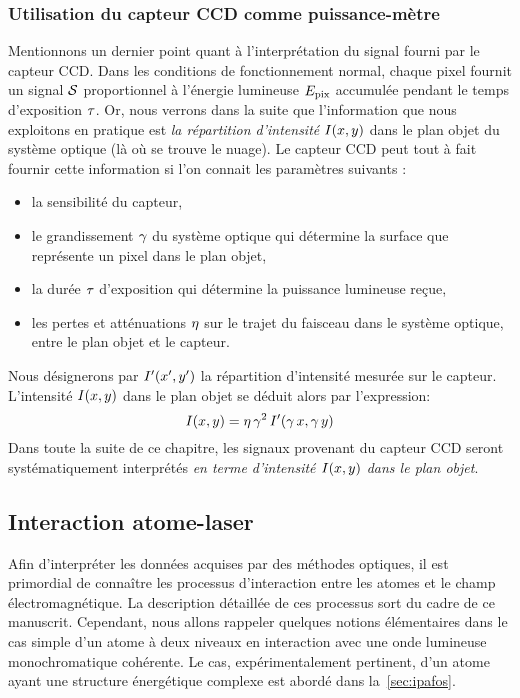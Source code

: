 \subsubsection{Utilisation du capteur CCD comme puissance-mètre}
Mentionnons un dernier point quant à l'interprétation du signal fourni par le capteur CCD. Dans les conditions de fonctionnement normal, chaque pixel fournit un signal ${\mathcal{S}}$ proportionnel à l'énergie lumineuse ${E_{\rm pix}}$ accumulée pendant le temps d'exposition ${\tau}$. Or, nous verrons dans la suite que l'information que nous exploitons en pratique est \emph{la répartition d'intensité} ${{I}(x,y)}$ dans le plan objet du système optique (là où se trouve le nuage). Le capteur CCD peut tout à fait fournir cette information si l'on connait les paramètres suivants :
\begin{itemize}
	\item la sensibilité du capteur,
	\item le grandissement ${\gamma}$ %
	du système optique qui détermine la surface que représente un pixel dans le plan objet,
	\item la durée ${\tau}$ %
	d'exposition qui détermine la puissance lumineuse reçue,
	\item les pertes et atténuations ${\eta}$ sur le trajet du faisceau dans le système optique, entre le plan objet et le capteur.
\end{itemize}
Nous désignerons par $I'(x',y')$ la répartition d'intensité mesurée sur le capteur. L'intensité ${{I}(x,y)}$ dans le plan objet se déduit alors par l'expression:%
%
\begin{equation}
	\Ixy = \AttenOptique \, \Grandis^2 \, I'(\Grandis\,x,\Grandis\,y)
	\label{eq:ICCD}
\end{equation}
Dans toute la suite de ce chapitre, les signaux provenant du capteur CCD seront systématiquement interprétés \emph{en terme d'intensité ${{I}(x,y)}$ dans le plan objet}.


\subsection{Interaction atome-laser}\label{sec:interAtomeLaser}
Afin d'interpréter les données acquises par des méthodes optiques, il est primordial de connaître les processus d'interaction entre les atomes et le champ électromagnétique.
La description détaillée de ces processus sort du cadre de ce manuscrit. Cependant, nous allons rappeler quelques notions élémentaires dans le cas simple d'un atome à deux niveaux en interaction avec une onde lumineuse monochromatique cohérente.
Le cas, expérimentalement pertinent, d'un atome ayant une structure énergétique complexe est abordé dans la~\autoref{sec:ipafos}.

